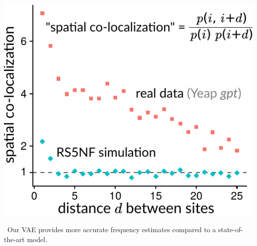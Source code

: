 \documentclass[nobib]{tufte-handout}
\begin{document}
\begin{marginfigure}[0.2in]%
\begin{centering}
    \includegraphics[width=\textwidth]{spatial-co-localization}
\end{centering}
  \caption{\
    Our VAE provides more accurate frequency estimates compared to a state-of-the-art model.
    }
  \label{FIGshm}
\end{marginfigure}%

\newpage


\end{document}
